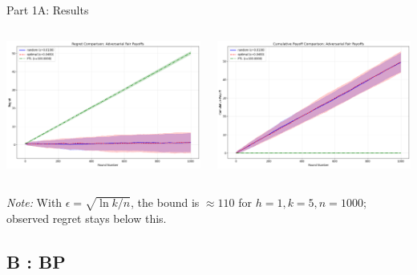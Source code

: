 \documentclass{beamer}
\begin{document}
\begin{frame}{Part 1A: Results}
\begin{columns}[T,onlytextwidth]
  \centering
  \includegraphics[width=\linewidth]{../figures/AFR_regret.png}

  \centering
  \includegraphics[width=\linewidth]{figures/AFR_payoff.png}
\end{columns}
\vspace{0.3em}
\small \textit{Note:} With $\epsilon=\sqrt{\ln k/n}$, the bound is $\approx 110$ for $h=1,k=5,n=1000$; observed regret stays below this.
\end{frame}

\subsection{B : BP}
\end{document}
